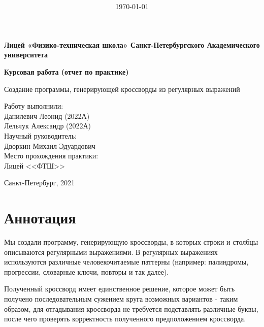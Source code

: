 \documentclass[12pt]{report}
\title{\bf \ReportTheme}
\author{\it \ReportAuthor}
\date{\today}
\begin{document}

    \begin{center}
    \large { {\bf Лицей «Физико-техническая школа»  Санкт-Петербургского Академического университета   } } 
    
    \vspace*{6\baselineskip}
    
    \vfill
    \large { {\bf Курсовая работа (отчет по практике) } } 
    
    \vspace*{6\baselineskip}
    
    Создание программы, генерирующей кроссворды из регулярных выражений \\
    \vspace*{3\baselineskip}
    
    \end{center}        
    \begin{flushright}
        Работу выполнили: \\
        Данилевич Леонид (2022А) \\
        Лельчук Александр (2022А) \\
        Научный руководитель: \\
        Дворкин Михаил Эдуардович \\
        Место прохождения практики: \\
        Лицей <<ФТШ>>
    \end{flushright}
    \vspace*{5\baselineskip}
    \begin{center}
        Санкт-Петербург, 2021
    \end{center}        
    \newpage %
    \chapter*{Аннотация}
    Мы создали программу, генерирующую кроссворды, в которых строки и столбцы описываются регулярными выражениями. В регулярных выражениях используются различные человекочитаемые паттерны (например: палиндромы, прогрессии, словарные ключи, повторы и так далее).
     
    Полученный кроссворд имеет единственное решение, которое может быть получено последовательным сужением круга возможных вариантов - таким образом, для отгадывания кроссворда не требуется подставлять различные буквы, после чего проверять корректность полученного предположением кроссворда.
\end{document}
